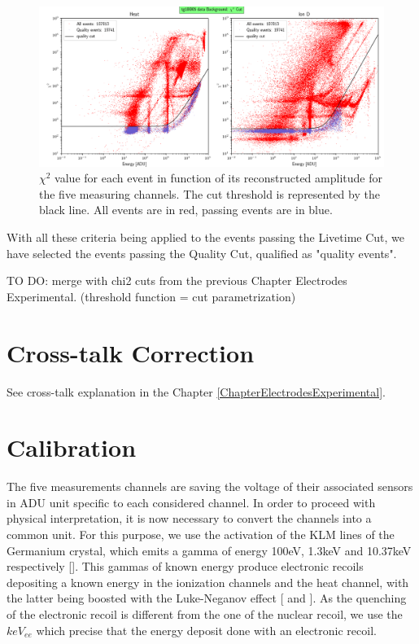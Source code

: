 \begin{figure}
\centering
\includegraphics[width=\linewidth,]{Figures/Neutron/chi2_cut.png}
\caption{$\chi^2$ value for each event in function of its reconstructed amplitude for the five measuring channels. The cut threshold is represented by the black line. All events are in red, passing events are in blue.}
\label{fig:chi2-cut}
\end{figure}

With all these criteria being applied to the events passing the Livetime Cut, we have selected the events passing the Quality Cut, qualified as "quality events".

TO DO: merge with chi2 cuts from the previous Chapter Electrodes Experimental.
(threshold function = cut parametrization)

\section{Cross-talk Correction}
\label{par:crosstalk}

See cross-talk explanation in the Chapter \ref{ChapterElectrodesExperimental}.


\section{Calibration}
\label{par:calibration}

The five measurements channels are saving the voltage of their associated sensors in ADU unit specific to each considered channel. In order to proceed with physical interpretation, it is now necessary to convert the channels into a common unit.
For this purpose, we use the activation of the KLM lines of the Germanium crystal, which emits a gamma of energy 100eV, 1.3keV and 10.37keV respectively [\cite{germanium-decay}]. This gammas of known energy produce electronic recoils depositing a known energy in the ionization channels and the heat channel, with the latter being boosted with the Luke-Neganov effect [\cite{luke-neganov-effect} and \citep{luke-neganov-interpretation}]. As the quenching of the electronic recoil is different from the one of the nuclear recoil, we use the $keV_{ee}$ which precise that the energy deposit done with an electronic recoil.

